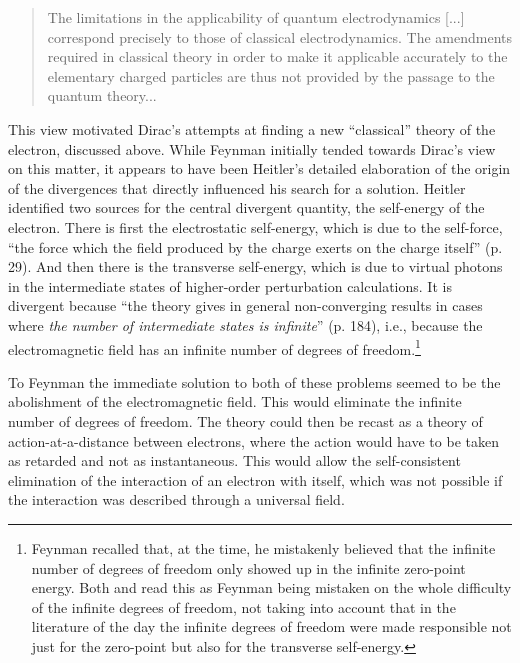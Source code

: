 \documentclass[12pt]{article}
\begin{document}
\begin{quote}
The limitations in the applicability of quantum electrodynamics [...] correspond precisely to those of classical electrodynamics. The amendments required in classical theory in order to make it applicable accurately to the elementary charged particles are thus not provided by the passage to the quantum theory... \citep[p. 296-297]{dirac_1935_the-principles}
\end{quote}

This view motivated Dirac's attempts at finding a new ``classical'' theory of the electron, discussed above. While Feynman initially tended towards Dirac's view on this matter, it appears to have been Heitler's detailed elaboration of the origin of the divergences that directly influenced his search for  a solution. Heitler identified two sources for the central divergent quantity, the self-energy of the electron. There is first the electrostatic self-energy, which is due to  the self-force, ``the force which the field produced by the charge exerts on the charge itself'' (p. 29). And then there is the transverse self-energy, which is due to virtual photons in the intermediate states of higher-order perturbation calculations. It is divergent because ``the theory gives in general non-converging results in cases where \emph{the number of intermediate states is infinite}'' (p. 184), i.e., because the electromagnetic field has an infinite number of degrees of freedom.\footnote{Feynman recalled that, at the time, he mistakenly believed that the infinite number of degrees of freedom only showed up in the infinite zero-point energy.  Both \citep[p.379-380]{schweber_1994_qed} and \citep[p.89]{mehra_1994_the-beat} read this as Feynman being mistaken on the whole difficulty of the infinite degrees of freedom, not taking into account that in the literature of the day the infinite degrees of freedom were made responsible not just for the zero-point but also for the transverse self-energy.}

To Feynman the immediate solution to both of these problems seemed to be the abolishment of the electromagnetic field. This would eliminate the infinite number of degrees of freedom. The theory could then be recast as a theory of action-at-a-distance between electrons, where the action would have to be taken as retarded and not as instantaneous. This would allow the self-consistent elimination of the interaction of an electron with itself, which was not possible if the interaction was described through a universal field.
\end{document}
